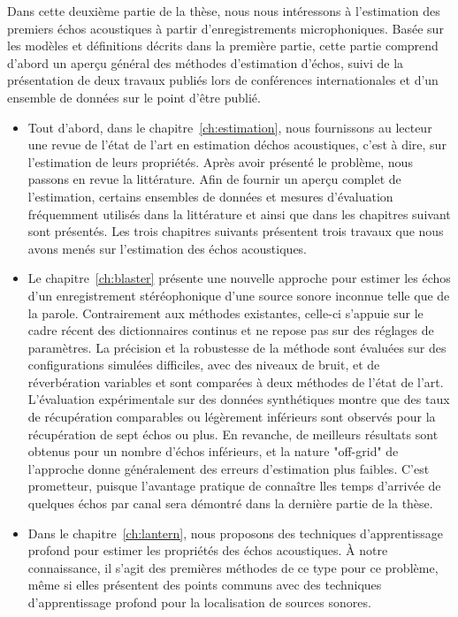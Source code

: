 Dans cette deuxième partie de la thèse, nous nous intéressons à l'estimation des premiers échos acoustiques à partir d'enregistrements microphoniques.
Basée sur les modèles et définitions décrits dans la première partie, cette partie comprend d'abord un aperçu général des méthodes d'estimation d'échos, suivi de la présentation de deux travaux publiés lors de conférences internationales et d'un ensemble de données sur le point d'être publié.
\begin{itemize}
    \item
    Tout d'abord, dans le chapitre~\ref{ch:estimation}, nous fournissons au lecteur une revue de l'état de l'art en estimation déchos acoustiques, c'est à dire, sur l'estimation de leurs propriétés.
    Après avoir présenté le problème, nous passons en revue la littérature.
    Afin de fournir un aperçu complet de l'estimation, certains ensembles de données et mesures d'évaluation fréquemment utilisés dans la littérature et ainsi que dans les chapitres suivant sont présentés.
    Les trois chapitres suivants présentent trois travaux que nous avons menés sur l'estimation des échos acoustiques.
    \item
    Le chapitre~\ref{ch:blaster} présente une nouvelle approche pour estimer les échos d'un enregistrement stéréophonique d'une source sonore inconnue telle que de la parole.
    Contrairement aux méthodes existantes, celle-ci s'appuie sur le cadre récent des dictionnaires continus et ne repose pas sur des réglages de paramètres.
    La précision et la robustesse de la méthode sont évaluées sur des configurations simulées difficiles, avec des niveaux de bruit, et de réverbération variables et sont comparées à deux méthodes de l'état de l'art.
    L'évaluation expérimentale sur des données synthétiques montre que des taux de récupération comparables ou légèrement inférieurs sont observés pour la récupération de sept échos ou plus.
    En revanche, de meilleurs résultats sont obtenus pour un nombre d'échos inférieurs, et la nature "off-grid" de l'approche donne généralement des erreurs d'estimation plus faibles.
    C'est prometteur, puisque l'avantage pratique de connaître lles temps d'arrivée de quelques échos par canal sera démontré dans la dernière partie de la thèse.
    \item
    Dans le chapitre~\ref{ch:lantern}, nous proposons des techniques d'apprentissage profond pour estimer les propriétés des échos acoustiques.
    À notre connaissance, il s'agit des premières méthodes de ce type pour ce problème, même si elles présentent des points communs avec des techniques d'apprentissage profond pour la localisation de sources sonores.

\end{itemize}
